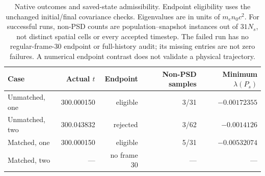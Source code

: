 \begin{table}[tbp]
\centering\small
\caption{Native outcomes and saved-state admissibility. Endpoint eligibility uses the unchanged initial/final covariance checks. Eigenvalues are in units of $m_en_0c^2$. For successful runs, non-PSD counts are population--snapshot instances out of $31N_s$, not distinct spatial cells or every accepted timestep. The failed run has no regular-frame-30 endpoint or full-history audit; its missing entries are not zero failures. A numerical endpoint contrast does not validate a physical trajectory.}
\label{tab:control-outcomes}
\begin{tabular}{lrrrr}
\toprule
Case & Actual $t$ & Endpoint & Non-PSD samples & Minimum $\lambda(P_s)$ \\
\midrule
Unmatched, one & 300.000150 & eligible & 3/31 & $-0.00172355$ \\
Unmatched, two & 300.043832 & rejected & 3/62 & $-0.0014126$ \\
Matched, one & 300.000150 & eligible & 5/31 & $-0.00532074$ \\
Matched, two & --- & no frame 30 & --- & --- \\
\bottomrule
\end{tabular}
\end{table}
